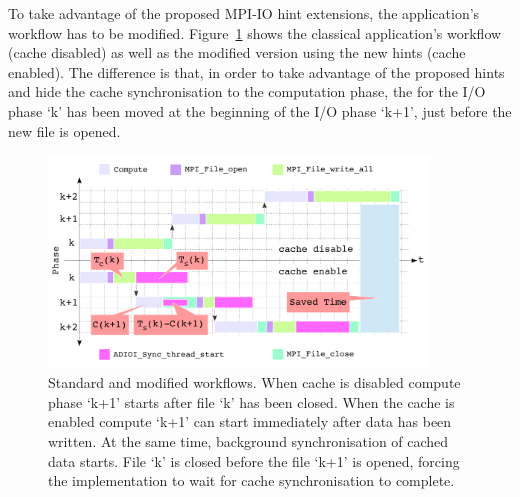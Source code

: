 To take advantage of the proposed MPI-IO hint extensions, the application's workflow has to be modified. Figure~\ref{figure: workflow3} shows the classical application's workflow (cache disabled) as well as the modified version using the new hints 
(cache enabled). The difference is that, in order to take advantage of the proposed hints and hide the cache synchronisation to the computation phase, the  for the I/O phase `k' has been moved at the beginning of the I/O 
phase `k+1', just before the new file is opened.

\begin{figure}[!htb]
  \centering
  \includegraphics[width=0.9\textwidth]{chapters/chapter3/figures/workflow}
  \caption{Standard and modified workflows. When cache is disabled compute phase `k+1' starts after file `k' has been closed. When the cache is enabled compute `k+1' can start immediately after data has been written. At the same time, background 
  synchronisation of cached data starts. File `k' is closed before the file `k+1' is opened, forcing the implementation to wait for cache synchronisation to complete.}
  \label{figure: workflow3}
\end{figure}

